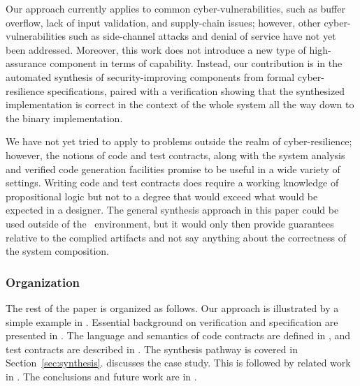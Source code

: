 Our approach currently applies to common cyber-vulnerabilities, such
as buffer overflow, lack of input validation, and supply-chain issues;
however, other cyber-vulnerabilities such as side-channel attacks and
denial of service have not yet been addressed. Moreover, this work
does not introduce a new type of high-assurance component in terms of
capability. Instead, our contribution is in the automated synthesis of
security-improving components from formal cyber-resilience
specifications, paired with a verification showing that the
synthesized implementation is correct in the context of the whole system all the way down to the binary implementation. 

We have not yet tried to apply
{\brfcs} to problems outside the realm of cyber-resilience; however,
the notions of code and test contracts, along with the system analysis
and verified code generation facilities promise to be useful in a wide
variety of settings. Writing code and test contracts does require a working knowledge of propositional logic but not to a degree that would exceed what would be expected in a designer. The general synthesis approach in this paper could be used outside of the \brfcs\ environment, but it would only then provide guarantees relative to the complied artifacts and not say anything about the correctness of the system composition.

\subsubsection*{Organization}
The rest of the paper is organized as follows.
Our approach is illustrated by a simple example in
. Essential background on {\agr} verification and specification are
presented in .  The language and semantics of code
contracts are defined in , and test
contracts are described in .  The synthesis pathway
is covered in Section~\ref{sec:synthesis}.
 discusses the case study.
This is followed by related work in .
The conclusions and future work are in .
